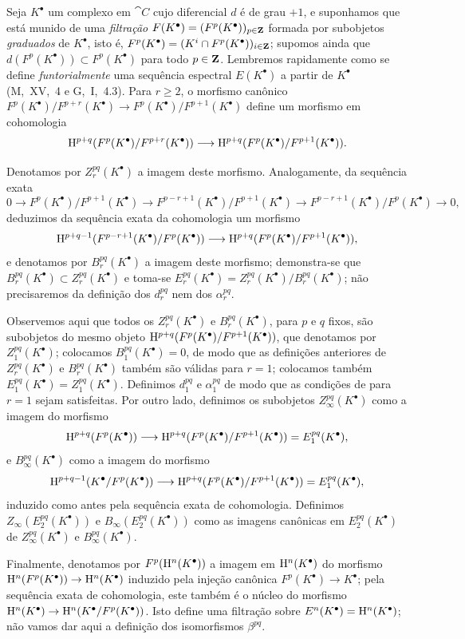 \begin{env}[11.2.2]
\label{0.11.2.2}
Seja $K^\bullet$ um complexo em $\cat{C}$ cujo diferencial $d$ é de grau $+1$, e suponhamos que está munido de uma \emph{filtração $F(K^\bullet)=(F^p(K^\bullet))_{p\in\mathbf{Z}}$} formada por subobjetos \emph{graduados}
de $K^\bullet$, isto é, $F^p(K^\bullet)=(K^i\cap F^p(K^\bullet))_{i\in\mathbf{Z}}$; supomos ainda que $d(F^p(K^\bullet))\subset F^p(K^\bullet)$ para todo $p\in\mathbf{Z}$.
Lembremos rapidamente como se define \emph{funtorialmente} uma sequência espectral $E(K^\bullet)$ a partir de $K^\bullet$ (M,~XV,~4 e G,~I,~4.3).
Para $r\geq 2$, o morfismo canônico $F^p(K^\bullet)/F^{p+r}(K^\bullet)\to F^p(K^\bullet)/F^{p+1}(K^\bullet)$ define um morfismo em cohomologia
\[
  \HH^{p+q}(F^p(K^\bullet)/F^{p+r}(K^\bullet))\to\HH^{p+q}(F^p(K^\bullet)/F^{p+1}(K^\bullet)).
\]

Denotamos por $Z_r^{pq}(K^\bullet)$ a imagem deste morfismo.
Analogamente, da sequência exata
\[
  0\to F^p(K^\bullet)/F^{p+1}(K^\bullet)\to F^{p-r+1}(K^\bullet)/F^{p+1}(K^\bullet)\to F^{p-r+1}(K^\bullet)/F^p(K^\bullet)\to 0,
\]
deduzimos da sequência exata da cohomologia um morfismo
\[
  \HH^{p+q-1}(F^{p-r+1}(K^\bullet)/F^p(K^\bullet))\to\HH^{p+q}(F^p(K^\bullet)/F^{p+1}(K^\bullet)),
\]
e denotamos por $B_r^{pq}(K^\bullet)$ a imagem deste morfismo; demonstra-se que $B_r^{pq}(K^\bullet)\subset Z_r^{pq}(K^\bullet)$ e toma-se $E_r^{pq}(K^\bullet)=Z_r^{pq}(K^\bullet)/B_r^{pq}(K^\bullet)$; não precisaremos da definição dos $d_r^{pq}$ nem dos $\alpha_r^{pq}$.

Observemos aqui que todos os $Z_r^{pq}(K^\bullet)$ e $B_r^{pq}(K^\bullet)$, para $p$ e $q$ fixos, são subobjetos do mesmo objeto $\mathrm{H}^{p+q}(F^p(K^\bullet)/F^{p+1}(K^\bullet))$, que denotamos por $Z_1^{pq}(K^\bullet)$; colocamos $B_1^{pq}(K^\bullet)=0$, de modo que as definições anteriores de $Z_r^{pq}(K^\bullet)$ e $B_r^{pq}(K^\bullet)$ também são válidas para $r=1$; colocamos também $E_1^{pq}(K^\bullet)=Z_1^{pq}(K^\bullet)$.
Definimos $d_1^{pq}$ e $\alpha_1^{pq}$ de modo que as condições de  para $r=1$ sejam satisfeitas.
Por outro lado, definimos os subobjetos $Z_\infty^{pq}(K^\bullet)$ como a imagem do morfismo
\[
  \HH^{p+q}(F^p(K^\bullet))\to\HH^{p+q}(F^p(K^\bullet)/F^{p+1}(K^\bullet))=E_1^{pq}(K^\bullet),
\]
e $B_\infty^{pq}(K^\bullet)$ como a imagem do morfismo
\[
  \HH^{p+q-1}(K^\bullet/F^p(K^\bullet))\to\HH^{p+q}(F^p(K^\bullet)/F^{p+1}(K^\bullet))=E_1^{pq}(K^\bullet),
\]
induzido como antes pela sequência exata de cohomologia.
Definimos $Z_\infty(E_2^{pq}(K^\bullet))$ e $B_\infty(E_2^{pq}(K^\bullet))$ como as imagens canônicas em $E_2^{pq}(K^\bullet)$ de $Z_\infty^{pq}(K^\bullet)$ e $B_\infty^{pq}(K^\bullet)$.

Finalmente, denotamos por $F^p(\mathrm{H}^n(K^\bullet))$ a imagem em $\mathrm{H}^n(K^\bullet)$ do morfismo $\HH^n(F^p(K^\bullet))\to\HH^n(K^\bullet)$ induzido pela injeção canônica $F^p(K^\bullet)\to K^\bullet$; pela sequência exata de cohomologia, este também é o núcleo do morfismo $\HH^n(K^\bullet)\to\HH^n(K^\bullet/F^p(K^\bullet))$.
Isto define uma filtração sobre $E^n(K^\bullet)=\mathrm{H}^n(K^\bullet)$; não vamos dar aqui a definição dos isomorfismos $\beta^{pq}$.
\end{env}

